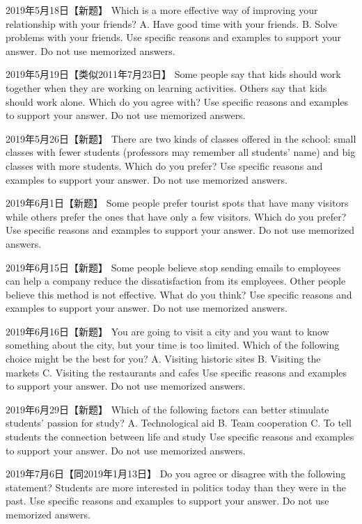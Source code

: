 2019年5月18日【新题】
Which is a more effective way of improving your relationship with your friends?
A. Have good time with your friends.
B. Solve problems with your friends.
Use specific reasons and examples to support your answer. Do not use memorized answers.

2019年5月19日【类似2011年7月23日】
Some people say that kids should work together when they are working on learning activities. Others say that kids should work alone. Which do you agree with?
Use specific reasons and examples to support your answer. Do not use memorized answers.

2019年5月26日【新题】
There are two kinds of classes offered in the school: small classes with fewer students (professors may remember all students' name) and big classes with more students. Which do you prefer?
Use specific reasons and examples to support your answer. Do not use memorized answers.

2019年6月1日【新题】
Some people prefer tourist spots that have many visitors while others prefer the ones that have only a few visitors. Which do you prefer?
Use specific reasons and examples to support your answer. Do not use memorized answers.

2019年6月15日【新题】
Some people believe stop sending emails to employees can help a company reduce the dissatisfaction from its employees. Other people believe this method is not effective. What do you think?
Use specific reasons and examples to support your answer. Do not use memorized answers.

2019年6月16日【新题】
You are going to visit a city and you want to know something about the city, but your time is too limited. Which of the following choice might be the best for you?
A. Visiting historic sites
B. Visiting the markets
C. Visiting the restaurants and cafes
Use specific reasons and examples to support your answer. Do not use memorized answers.

2019年6月29日【新题】
Which of the following factors can better stimulate students' passion for study?
A. Technological aid
B. Team cooperation
C. To tell students the connection between life and study
Use specific reasons and examples to support your answer. Do not use memorized answers.

2019年7月6日【同2019年1月13日】
Do you agree or disagree with the following statement?
Students are more interested in politics today than they were in the past.
Use specific reasons and examples to support your answer. Do not use memorized answers.

